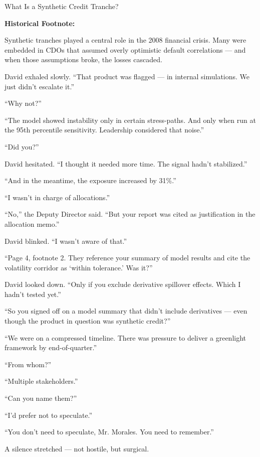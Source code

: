 \begin{TechnicalSidebar}{What Is a Synthetic Credit Tranche?}
  \medskip

  \textbf{Historical Footnote:}  

  \medskip

  Synthetic tranches played a central role in the 2008 financial crisis. Many were embedded in CDOs that assumed 
  overly optimistic default correlations — and when those assumptions broke, the losses cascaded.
  
\end{TechnicalSidebar}
 
\medskip

David exhaled slowly. ``That product was flagged — in internal simulations. We just didn’t escalate it.''

``Why not?''

``The model showed instability only in certain stress-paths. And only when run at the 95th percentile sensitivity. 
Leadership considered that noise.''

``Did you?''

David hesitated. ``I thought it needed more time. The signal hadn’t stabilized.''

``And in the meantime, the exposure increased by 31\%.''

``I wasn’t in charge of allocations.''

``No,'' the Deputy Director said. ``But your report was cited as justification in the allocation memo.''

David blinked. ``I wasn’t aware of that.''

``Page 4, footnote 2. They reference your summary of model results and cite the volatility corridor as ‘within 
tolerance.’ Was it?''

David looked down. ``Only if you exclude derivative spillover effects. Which I hadn’t tested yet.''

``So you signed off on a model summary that didn’t include derivatives — even though the product in question 
was synthetic credit?''

``We were on a compressed timeline. There was pressure to deliver a greenlight framework by end-of-quarter.''

``From whom?''

``Multiple stakeholders.''

``Can you name them?''

``I'd prefer not to speculate.''

``You don’t need to speculate, Mr. Morales. You need to remember.''

A silence stretched — not hostile, but surgical.

